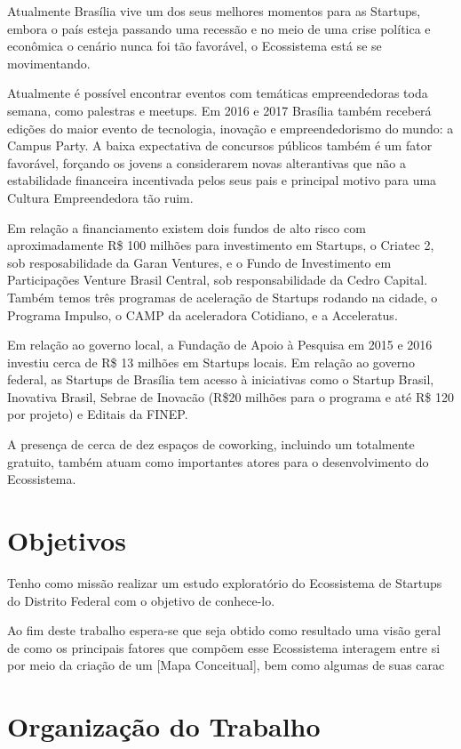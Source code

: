 Atualmente Brasília vive um dos seus melhores momentos para as Startups, embora o país esteja passando uma recessão e no meio de uma crise política e econômica o cenário nunca foi tão favorável, o Ecossistema está se se movimentando. 

Atualmente é possível encontrar eventos com temáticas empreendedoras toda semana, como palestras e meetups. Em 2016 e 2017 Brasília também receberá edições do maior evento de tecnologia, inovação e empreendedorismo do mundo: a Campus Party. A baixa expectativa de concursos públicos também é um fator favorável, forçando os jovens a considerarem novas alterantivas que não a estabilidade financeira incentivada pelos seus pais e principal motivo para uma Cultura Empreendedora tão ruim.

Em relação a financiamento existem dois fundos de alto risco com aproximadamente R\$ 100 milhões para investimento em Startups, o Criatec 2, sob resposabilidade da Garan Ventures, e o Fundo de Investimento em Participações Venture Brasil Central, sob responsabilidade da Cedro Capital. Também temos três programas de aceleração de Startups rodando na cidade, o Programa Impulso, o CAMP da aceleradora Cotidiano, e a Acceleratus. 

Em relação ao governo local, a Fundação de Apoio à Pesquisa em 2015 e 2016 investiu cerca de R\$ 13 milhões em Startups locais. Em relação ao governo federal, as Startups de Brasília tem acesso à iniciativas como o Startup Brasil, Inovativa Brasil, Sebrae de Inovacão (R\$20 milhões para o programa e até R\$ 120 por projeto) e Editais da FINEP.

A presença de cerca de dez espaços de coworking, incluindo um totalmente gratuito, também atuam como importantes atores para o desenvolvimento do Ecossistema.

\section{Objetivos}
\label{section:objetivos}

Tenho como missão realizar um estudo exploratório do Ecossistema de Startups do Distrito Federal com o objetivo de conhece-lo. 

Ao fim deste trabalho espera-se que seja obtido como resultado uma visão geral de como os principais fatores que compõem esse Ecossistema interagem entre si por meio da criação de um [Mapa Conceitual], bem como algumas de suas carac

\section{Organização do Trabalho}
\label{section:organizacao_do_trabalho}


